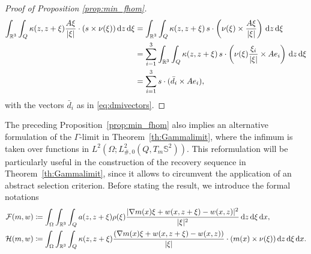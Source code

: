 \documentclass[reqno,11pt]{amsart}
\numberwithin{equation}{section}
\theoremstyle{thmlemcorr}
\numberwithin{theorem}{section}
\theoremstyle{thmlemcorr*}
\theoremstyle{defi}
\theoremstyle{remexample}
\theoremstyle{ass}
\newcommand{\R}{\mathbb{R}}
\renewcommand{\S}{\mathbb{S}}
\newcommand{\dd}{\,\mathrm{d}}
\DeclarePairedDelimiter{\abs}{\lvert}{\rvert}
\newcommand{\1}{\mathds{1}}
\newcommand{\Om}{\Omega}
\newcommand{\dl}{\,\mathrm{d}}
\begin{document}
\begin{proof}[Proof of Proposition \ref{prop:min_fhom}]
    \begin{align*}
        \int_{\R^3}\int_{Q}\kappa(z,z+\xi)\frac{A\xi}{|\xi|} \cdot(s \times \nu(\xi))\dd z\dd \xi &= \int_{\R^3}\int_{Q} \kappa(z,z+\xi) \,s\cdot\left(\nu(\xi) \times \frac{A\xi}{\abs{\xi}}\right) \dd z\dd \xi\\
        &=\sum_{i=1}^{3} \int_{\R^3}\int_{Q} \kappa(z,z+\xi)\, s\cdot\left(\nu(\xi)\frac{\xi_i}{\abs{\xi}} \times Ae_i\right) \dd z\dd \xi\\
        &=\sum_{i=1}^{3}s\cdot(\bar{d}_i\times Ae_i),
    \end{align*}
    with the vectors $\bar{d}_i$ as in \eqref{eq:dmivectors}.
\end{proof}


The preceding Proposition~\ref{prop:min_fhom} also implies an alternative formulation of the \(\Gamma\)-limit in Theorem~\ref{th:Gammalimit}, where the infimum is taken over functions in \(L^2(\Om;L^2_{\#,0}(Q,T_{m}\S^2))\). This reformulation will be particularly useful in the construction of the recovery sequence in Theorem~\ref{th:Gammalimit}, since it allows to circumvent the application of an abstract selection criterion. Before stating the result, we introduce the formal notations
\begin{align}
    \mathcal{F}(m,w)
    &\coloneqq \int_{\Om}\int_{\R^3}\int_Q a(z,z+\xi)\rho(\xi)\frac{\abs{\nabla m(x)\xi+ w(x,z+\xi)-w(x,z)}^2}{\abs{\xi}^2}
    \dl z\dl \xi\dl x,   \label{F_2} \\
    \mathcal{H}(m,w)
    &\coloneqq \int_{\Om}\int_{\R^3}\int_Q \kappa(z,z+\xi)\frac{(\nabla m(x)\xi+w(x,z+\xi)-w(x,z))}{|\xi|}\cdot(m(x)\times \nu(\xi)) \dd z \dl \xi\dl x. \label{H_2}
\end{align}
\end{document}
